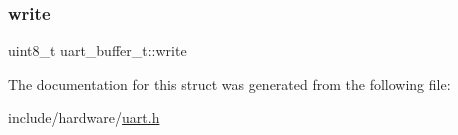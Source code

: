 \mbox{\label{structuart__buffer__t_aa894600d0e69b57eb7423c772fc9fd8c}} 
\subsubsection{\texorpdfstring{write}{write}}
{\footnotesize\ttfamily uint8\+\_\+t uart\+\_\+buffer\+\_\+t\+::write}



The documentation for this struct was generated from the following file\+:\begin{DoxyCompactItemize}
\item 
include/hardware/\hyperlink{uart_8h}{uart.\+h}\end{DoxyCompactItemize}
